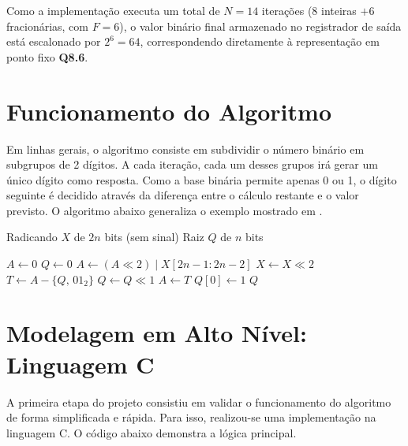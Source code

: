 \documentclass[conference]{IEEEtran}
\begin{document}
Como a implementação executa um total de $N = 14$ iterações ($8$ inteiras $+ 6$ fracionárias, com $F = 6$), o valor binário final armazenado no registrador de saída está escalonado por $2^6 = 64$, correspondendo diretamente à representação em ponto fixo \textbf{Q8.6}.


\section{Funcionamento do Algoritmo}
Em linhas gerais, o algoritmo consiste em subdividir o número binário em subgrupos de 2 dígitos. A cada iteração, cada um desses grupos irá gerar um único dígito como resposta. Como a base binária permite apenas 0 ou 1, o dígito seguinte é decidido através da diferença entre o cálculo restante e o valor previsto. O algoritmo abaixo generaliza o exemplo mostrado em \cite{projectf_sqrt}.
\begin{algorithm}[htbp]
\caption{Raiz quadrada inteira binária em ponto fixo}
\label{alg:sqrt-registradores}
\begin{algorithmic}[1]
\Require Radicando $X$ de $2n$ bits (sem sinal)
\Ensure Raiz $Q$ de $n$ bits

\State $A \gets 0$ 
\State $Q \gets 0$ 
    \State $A \gets (A \ll 2) \mid X[2n\!-\!1\!:\!2n\!-\!2]$ 
    \State $X \gets X \ll 2$
    \State $T \gets A - \{Q,\,01_2\}$ 
    \State $Q \gets Q \ll 1$
        \State $A \gets T$
        \State $Q[0] \gets 1$
    \EndIf
\EndFor
\State \Return $Q$
\end{algorithmic}
\end{algorithm}

\newpage
\section{Modelagem em Alto Nível: Linguagem C}
A primeira etapa do projeto consistiu em validar o funcionamento do algoritmo de forma simplificada e rápida. Para isso, realizou-se uma implementação na linguagem C. O código abaixo demonstra a lógica principal.
\end{document}
